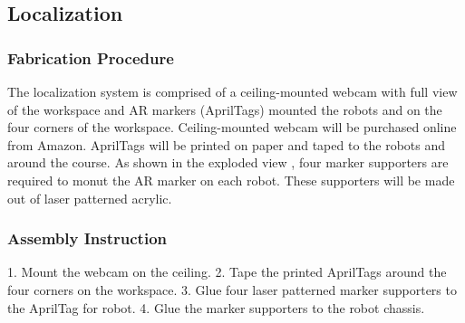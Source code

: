 
\subsection{Localization}
\label{sec:hardware_localization}

\subsubsection{Fabrication Procedure}
\label{sec:localization_fab}
The localization system is comprised of a ceiling-mounted webcam with full view of the workspace and AR markers (AprilTags) mounted the robots and on the four corners of the workspace. Ceiling-mounted webcam will be purchased online from Amazon. AprilTags will be printed on paper and taped to the robots and around the course. As shown in the exploded view , four marker supporters are required to monut the AR marker on each robot. These supporters will be made out of laser patterned acrylic. 

\subsubsection{Assembly Instruction}
\label{sec:localization_assemb}
1. Mount the webcam on the ceiling.
2. Tape the printed AprilTags around the four corners on the workspace.
3. Glue four laser patterned marker supporters to the AprilTag for robot.
4. Glue the marker supporters to the robot chassis. 
